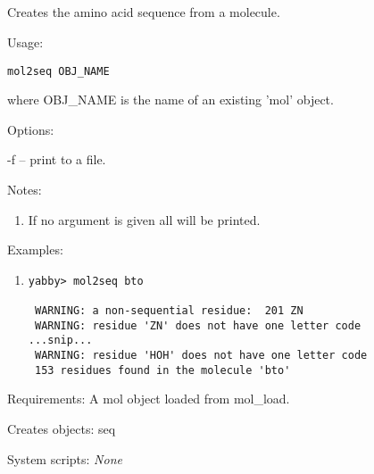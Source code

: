 

\subsection[mol2seq]{  }



Creates the amino acid sequence from a molecule.


\begin{description}


\item{Usage:}

{\tt mol2seq OBJ\_NAME}

where OBJ\_NAME is the name of an existing 'mol' object.


\item{Options:}
\begin{description}
\item -f -- print to a file.
\end{description}


\item{Notes:}
\begin{enumerate}
\item If no argument is given all will be printed.
\end{enumerate}


\item{Examples:}
\begin{enumerate}

\item
\begin{verbatim}
yabby> mol2seq bto

 WARNING: a non-sequential residue:  201 ZN
 WARNING: residue 'ZN' does not have one letter code
...snip...
 WARNING: residue 'HOH' does not have one letter code
 153 residues found in the molecule 'bto'
\end{verbatim}

\end{enumerate}


\item{Requirements:} A mol object loaded from mol\_load.


\item{Creates objects:} seq


\item{System scripts:} {\em None}

\end{description}

